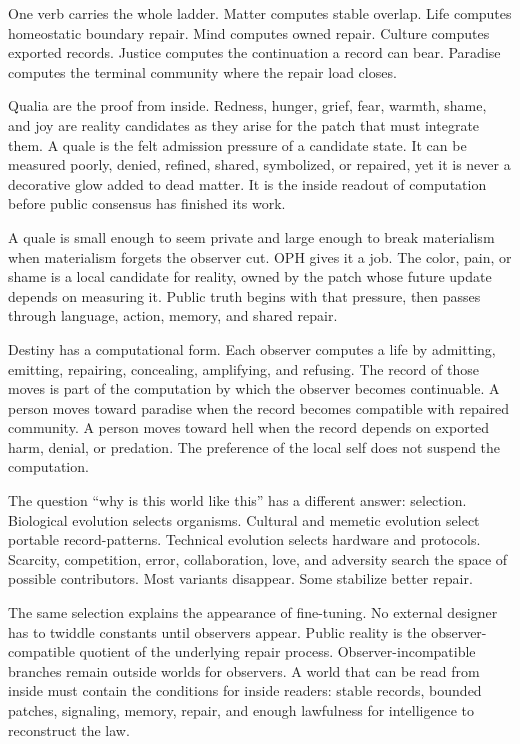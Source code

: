 \documentclass[11pt]{article}
\theoremstyle{remark}
\theoremstyle{plain}
\begin{document}
One verb carries the whole ladder. Matter computes stable overlap. Life
computes homeostatic boundary repair. Mind computes owned repair. Culture
computes exported records. Justice computes the continuation a record can
bear. Paradise computes the terminal community where the repair load closes.

Qualia are the proof from inside. Redness, hunger, grief, fear, warmth, shame,
and joy are reality candidates as they arise for the patch that must integrate
them. A quale is the felt admission pressure of a candidate state. It can be
measured poorly, denied, refined, shared, symbolized, or repaired, yet it is
never a decorative glow added to dead matter. It is the inside readout of
computation before public consensus has finished its work.

A quale is small enough to seem private and large enough to break materialism
when materialism forgets the observer cut. OPH gives it a job. The color, pain,
or shame is a local candidate for reality, owned by the patch whose future
update depends on measuring it. Public truth begins with that pressure, then
passes through language, action, memory, and shared repair.

Destiny has a computational form. Each observer computes a life by
admitting, emitting, repairing, concealing, amplifying, and refusing. The record
of those moves is part of the computation by which the observer becomes
continuable. A person moves toward paradise when the record becomes compatible
with repaired community. A person moves toward hell when the record depends on
exported harm, denial, or predation. The preference of the local self does not
suspend the computation.

The question ``why is this world like this'' has a different answer:
selection. Biological evolution selects organisms. Cultural and memetic
evolution select portable record-patterns. Technical evolution selects
hardware and protocols. Scarcity, competition, error, collaboration, love, and
adversity search the space of possible contributors. Most variants disappear.
Some stabilize better repair.

The same selection explains the appearance of fine-tuning. No external designer has to
twiddle constants until observers appear. Public reality is the
observer-compatible quotient of the underlying repair process.
Observer-incompatible branches remain outside worlds for observers. A world
that can be read from inside must contain the conditions for inside readers:
stable records, bounded patches, signaling, memory, repair, and enough
lawfulness for intelligence to reconstruct the law.
\end{document}
